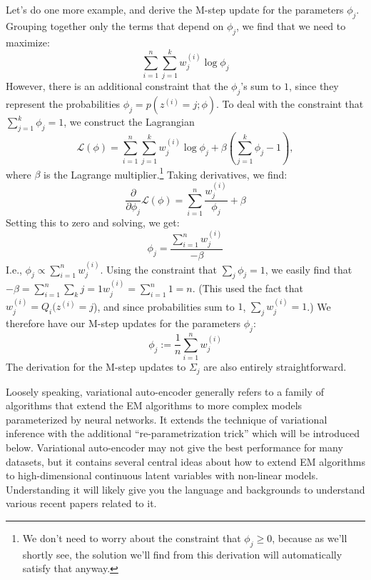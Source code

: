 Let's do one more example, and derive the M-step update for the
parameters $\phi_j$. Grouping together only the terms that depend on $\phi_j$, we find that
we need to maximize:
\begin{equation*}
    \sum_{i=1}^n \sum_{j=1}^k w^{(i)}_j \log\phi_j
\end{equation*}
However, there is an additional constraint that the $\phi_j$'s sum to $1$, since they
represent the probabilities $\phi_j = p(z^{(i)} = j;\phi)$. To deal with the constraint
that $\sum^k_{j=1} \phi_j = 1$, we construct the Lagrangian
\begin{equation*}
    \mathcal L(\phi) = \sum_{i=1}^n \sum_{j=1}^k w^{(i)}_j \log\phi_j + \beta(\sum_{j=1}^k \phi_j - 1),
\end{equation*}
where $\beta$ is the Lagrange multiplier.\footnote{
We don't need to worry about the constraint that $\phi_j \ge 0$, because as we'll shortly see,
the solution we'll find from this derivation will automatically satisfy that anyway.    
} Taking derivatives, we find:
\begin{equation*}
    \frac{\partial}{\partial\phi_j} \mathcal L(\phi) = \sum_{i=1}^n \frac{w^{(i)}_j}{\phi_j} + \beta
\end{equation*}
Setting this to zero and solving, we get:
\begin{equation*}
    \phi_j = \frac{\sum^n_{i=1} w^{(i)}_j}{-\beta}
\end{equation*}
I.e., $\phi_j \propto \sum^n_{i=1} w^{(i)}_j$. Using the constraint that
$\sum_j \phi_j = 1$, we easily find that $-\beta = \sum^n_{i=1} \sum_k j=1 w^{(i)}_j = \sum^n_{i=1} 1 = n$.
(This used the fact that $w^{(i)}_j = Q_i (z^{(i)} = j$), and since probabilities sum to $1$,
$\sum_j w^{(i)}_j = 1$.) We therefore
have our M-step updates for the parameters $\phi_j$:
\begin{equation}
    \phi_j := \frac{1}{n} \sum_{i=1}^n w^{(i)}_j
\end{equation}
The derivation for the M-step updates to $\Sigma_j$ are also entirely
straightforward.

\vspace{1cm}
\begin{fullwidth}
\label{cha:variational}
\end{fullwidth}
Loosely speaking, variational auto-encoder\cite{kingma2013auto} generally refers to a family of
algorithms that extend the EM algorithms to more complex models
parameterized by neural networks. It extends the technique of variational inference
with the additional ``re-parametrization trick'' which will be introduced
below. Variational auto-encoder may not give the best performance for many
datasets, but it contains several central ideas about how to extend EM
algorithms to high-dimensional continuous latent variables with non-linear
models. Understanding it will likely give you the language and backgrounds to
understand various recent papers related to it.

